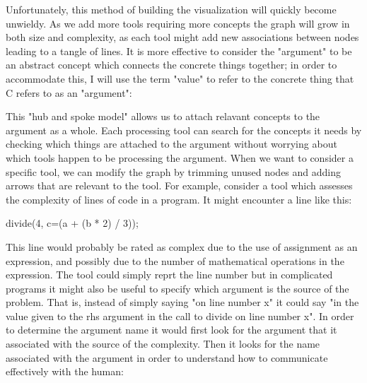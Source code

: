 Unfortunately, this method of building the visualization will quickly become unwieldy.
As we add more tools requiring more concepts the graph will grow in both size and
complexity, as each tool might add new associations between nodes leading to a tangle of
lines.
It is more effective to consider the "argument" to be an abstract concept which connects
the concrete things together; in order to accommodate this, I will use the term "value"
to refer to the concrete thing that C refers to as an "argument":


This "hub and spoke model" allows us to attach relavant concepts to the argument as a
whole.
Each processing tool can search for the concepts it needs by checking which things are
attached to the argument without worrying about which tools happen to be processing the
argument.
When we want to consider a specific tool, we can modify the graph by trimming unused nodes
and adding arrows that are relevant to the tool.
For example, consider a tool which assesses the complexity of lines of code in a program.
It might encounter a line like this:

\begin{pygmented}[lang=c]
divide(4, c=(a + (b * 2) / 3));
\end{pygmented}

This line would probably be rated as complex due to the use of assignment as an
expression, and possibly due to the number of mathematical operations in the expression.
The tool could simply reprt the line number but in complicated programs it might also be
useful to specify which argument is the source of the problem.
That is, instead of simply saying "on line number x" it could say "in the value given to
the rhs argument in the call to divide on line number x".
In order to determine the argument name it would first look for the argument that it
associated with the source of the complexity.
Then it looks for the name associated with the argument in order to understand how to
communicate effectively with the human:

